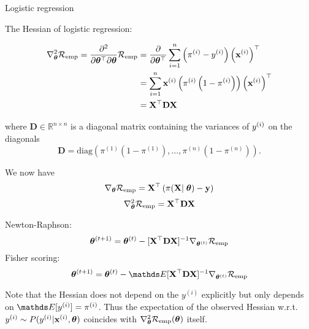\documentclass[11pt,compress,t,notes=noshow, xcolor=table]{beamer}
\begin{document}
\begin{vbframe}{Logistic regression}
\framebreak

The Hessian of logistic regression:

{\small
\begin{align*}
  \nabla^2_{\bm{\theta}}\mathcal{R}_{\text{emp}}  = \frac{\partial^2}{\partial{\bm{\theta}^\top}\partial\bm{\theta}}\mathcal{R}_{\text{emp}}  & =  
 \frac{\partial}{\partial{\bm{\theta}^\top}} \sum\limits_{i=1}^n \left(\pi^{(i)} - y^{(i)}\right)\left(\mathbf{x}^{(i)}\right)^\top\\
 & =  
  \sum^n_{i=1}\mathbf{x}^{(i)} \left(\pi^{(i)}\left(1-\pi^{(i)}\right)\right)\left(\mathbf{x}^{(i)}\right)^\top\\
  & =  
\mathbf{X}^\top \mathbf{D} \mathbf{X}\\
\end{align*}

where $\mathbf{D} \in \mathbb{R}^{n\times n}$ is a diagonal matrix containing the variances of $y^{(i)}$ on the diagonals 
$$\mathbf{D}=\text{diag}\left(\pi^{(1)}(1-\pi^{(1)}), \dots, \pi^{(n)}(1-\pi^{(n)})\right).$$
}

\framebreak
We now have
$$\nabla_{\bm{\theta}}\mathcal{R}_{\text{emp}} =  \mathbf{X}^\top\left(\pi(\mathbf{X}\vert\;\bm{\theta}) - \mathbf{y}\right) $$
$$\nabla^2_{\bm{\theta}}\mathcal{R}_{\text{emp}} =  \mathbf{X}^\top \mathbf{D} \mathbf{X}$$

\lz

Newton-Raphson: $$\bm{\theta}^{(t+1)}=\bm{\theta}^{(t)} - [\mathbf{X}^\top \mathbf{D} \mathbf{X}]^{-1}\nabla_{\bm{\theta}^{(t)}}\mathcal{R}_{\text{emp}} $$
Fisher scoring: $$\thetav^{(t+1)}=\thetav^{(t)} - \E[\mathbf{X}^\top \mathbf{D} \mathbf{X}]^{-1}\nabla_{\thetav^{(t)}}\riske $$

Note that the Hessian does not depend on the $y^{(i)}$ explicitly but only depends on $\E[y^{(i)}]=\pi^{(i)}$. Thus the expectation of the observed Hessian w.r.t. $y^{(i)}\sim P(y^{(i)}|\mathbf{x}^{(i)},\bm{\theta})$ coincides with $\nabla^2_{\bm{\theta}}\mathcal{R}_{\text{emp}}(\bm{\theta})$ itself.
\end{vbframe}
\end{document}
